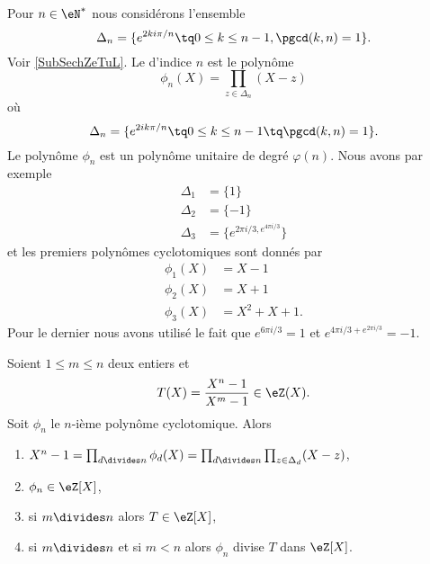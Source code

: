 Pour \( n\in\eN^*\) nous considérons l'ensemble
\begin{equation}
    \Delta_n=\{  e^{2ki\pi/n}\tq 0\leq k\leq n-1,\pgcd(k,n)=1 \}.
\end{equation}
Voir \ref{SubSechZeTuL}. Le  d'indice \( n\) est le polynôme
\begin{equation}    \label{EqLjGYKK}
    \phi_n(X)=\prod_{z\in\Delta_n}(X-z)
\end{equation}
où
\begin{equation}
    \Delta_n=\{  e^{2ik\pi/n}\tq 0\leq k\leq n-1\tq \pgcd(k,n)=1 \}.
\end{equation}
Le polynôme \( \phi_n\) est un polynôme unitaire de degré \( \varphi(n)\). Nous avons par exemple
\begin{subequations}
    \begin{align}
        \Delta_1&=\{ 1 \}\\
        \Delta_2&=\{ -1 \}\\
        \Delta_3&=\{  e^{2\pi i/3, e^{4\pi i/3}} \}
    \end{align}
\end{subequations}
et les premiers polynômes cyclotomiques sont donnés par
\begin{subequations}
    \begin{align}
        \phi_1(X)&=X-1\\
        \phi_2(X)&=X+1\\
        \phi_3(X)&=X^2+X+1.
    \end{align}
\end{subequations}
Pour le dernier nous avons utilisé le fait que \(  e^{6\pi i/3}=1\) et \(  e^{4\pi i/3+ e^{2\pi i/3}}=-1\).

\begin{proposition}     \label{PropUImYnL}
    Soient \( 1\leq m\leq n\) deux entiers et
    \begin{equation}
        T(X)=\frac{ X^n-1 }{ X^m-1 }\in \eZ(X).
    \end{equation}
    Soit \( \phi_n\) le \( n\)-ième polynôme cyclotomique. Alors
    \begin{enumerate}
        \item   \label{ItempnHhYk}
            \( X^n-1=\prod_{d\divides n}\phi_d(X)=\prod_{d\divides n}\prod_{z\in \Delta_d}(X-z)\),
        \item
            \( \phi_n\in \eZ[X]\),
        \item   \label{ItemhpDPKE}
            si \( m\divides n\) alors \( T\in \eZ[X]\),
        \item
            si \( m\divides n\) et si \( m<n\) alors \( \phi_n\) divise \( T\) dans \( \eZ[X]\).
    \end{enumerate}
\end{proposition}

